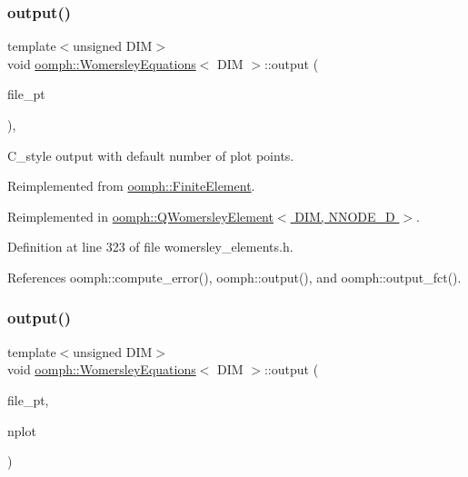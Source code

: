 \subsubsection{\texorpdfstring{output()}{output()}\hspace{0.1cm}{\footnotesize\ttfamily [3/4]}}
{\footnotesize\ttfamily template$<$unsigned D\+IM$>$ \\
void \hyperlink{classoomph_1_1WomersleyEquations}{oomph\+::\+Womersley\+Equations}$<$ D\+IM $>$\+::output (\begin{DoxyParamCaption}\item[{F\+I\+LE $\ast$}]{file\+\_\+pt }\end{DoxyParamCaption})\hspace{0.3cm}{\ttfamily [inline]}, {\ttfamily [virtual]}}



C\+\_\+style output with default number of plot points. 



Reimplemented from \hyperlink{classoomph_1_1FiniteElement_a72cddd09f8ddbee1a20a1ff404c6943e}{oomph\+::\+Finite\+Element}.



Reimplemented in \hyperlink{classoomph_1_1QWomersleyElement_a2d73507033cac13eed334354502663d6}{oomph\+::\+Q\+Womersley\+Element$<$ D\+I\+M, N\+N\+O\+D\+E\+\_\+D $>$}.



Definition at line 323 of file womersley\+\_\+elements.\+h.



References oomph\+::compute\+\_\+error(), oomph\+::output(), and oomph\+::output\+\_\+fct().

\mbox{\label{classoomph_1_1WomersleyEquations_ad5254560613d0c22280f15cc9cb42dc7}} 
\subsubsection{\texorpdfstring{output()}{output()}\hspace{0.1cm}{\footnotesize\ttfamily [4/4]}}
{\footnotesize\ttfamily template$<$unsigned D\+IM$>$ \\
void \hyperlink{classoomph_1_1WomersleyEquations}{oomph\+::\+Womersley\+Equations}$<$ D\+IM $>$\+::output (\begin{DoxyParamCaption}\item[{F\+I\+LE $\ast$}]{file\+\_\+pt,  }\item[{const unsigned \&}]{nplot }\end{DoxyParamCaption})\hspace{0.3cm}{\ttfamily [virtual]}}



